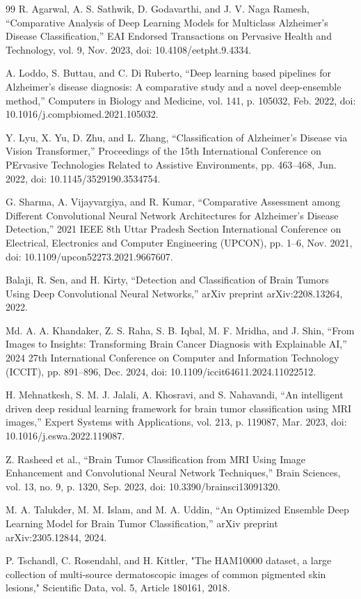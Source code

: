 \documentclass[runningheads]{llncs}
\begin{document}
\begin{thebibliography}{99}
 R. Agarwal, A. S. Sathwik, D. Godavarthi, and J. V. Naga Ramesh, “Comparative Analysis of Deep Learning Models for Multiclass Alzheimer’s Disease Classification,” EAI Endorsed Transactions on Pervasive Health and Technology, vol. 9, Nov. 2023, doi: 10.4108/eetpht.9.4334.

 A. Loddo, S. Buttau, and C. Di Ruberto, “Deep learning based pipelines for Alzheimer’s disease diagnosis: A comparative study and a novel deep-ensemble method,” Computers in Biology and Medicine, vol. 141, p. 105032, Feb. 2022, doi: 10.1016/j.compbiomed.2021.105032.

 Y. Lyu, X. Yu, D. Zhu, and L. Zhang, “Classification of Alzheimer’s Disease via Vision Transformer,” Proceedings of the 15th International Conference on PErvasive Technologies Related to Assistive Environments, pp. 463–468, Jun. 2022, doi: 10.1145/3529190.3534754.

 G. Sharma, A. Vijayvargiya, and R. Kumar, “Comparative Assessment among Different Convolutional Neural Network Architectures for Alzheimer’s Disease Detection,” 2021 IEEE 8th Uttar Pradesh Section International Conference on Electrical, Electronics and Computer Engineering (UPCON), pp. 1–6, Nov. 2021, doi: 10.1109/upcon52273.2021.9667607.

 Balaji, R. Sen, and H. Kirty, “Detection and Classification of Brain Tumors Using Deep Convolutional Neural Networks,” arXiv preprint arXiv:2208.13264, 2022.

 Md. A. A. Khandaker, Z. S. Raha, S. B. Iqbal, M. F. Mridha, and J. Shin, “From Images to Insights: Transforming Brain Cancer Diagnosis with Explainable AI,” 2024 27th International Conference on Computer and Information Technology (ICCIT), pp. 891–896, Dec. 2024, doi: 10.1109/iccit64611.2024.11022512.

 H. Mehnatkesh, S. M. J. Jalali, A. Khosravi, and S. Nahavandi, “An intelligent driven deep residual learning framework for brain tumor classification using MRI images,” Expert Systems with Applications, vol. 213, p. 119087, Mar. 2023, doi: 10.1016/j.eswa.2022.119087.

 Z. Rasheed et al., “Brain Tumor Classification from MRI Using Image Enhancement and Convolutional Neural Network Techniques,” Brain Sciences, vol. 13, no. 9, p. 1320, Sep. 2023, doi: 10.3390/brainsci13091320.

 M. A. Talukder, M. M. Islam, and M. A. Uddin, “An Optimized Ensemble Deep Learning Model for Brain Tumor Classification,” arXiv preprint arXiv:2305.12844, 2024.

 P. Tschandl, C. Rosendahl, and H. Kittler, "The HAM10000 dataset, a large collection of multi-source dermatoscopic images of common pigmented skin lesions," Scientific Data, vol. 5, Article 180161, 2018.

\end{thebibliography}
\end{document}

